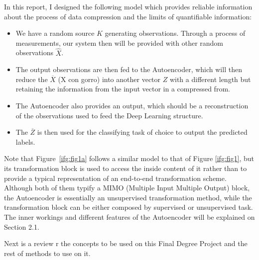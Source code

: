 
In this report, I designed the following model which provides reliable information about the process of data compression and the limits of quantifiable information:

\begin{itemize}
\item  We have a random source $K$ generating observations. Through a process of measurements, our system then will be provided with other random observations $\hat{X}$. 

\item The output observations  are then fed to the Autoencoder, which will then reduce the $\overline X$ (X con gorro) into another vector $Z$ with a different length but retaining the information from the input vector in a compressed from. 

\item The Autoencoder also provides  an output, which should be a reconstruction of the observations used to feed the Deep Learning structure. 

\item The $\overline Z$ is then used for the classifying task of choice to output the predicted labels. 

\end{itemize}

Note that Figure~\ref{ifg:fig1a} follows a similar model to that of Figure \ref{ifg:fig1}, but its transformation block is used to access the inside content of it rather than to provide a typical representation of an end-to-end transformation scheme. Although both of them typify a MIMO (Multiple Input Multiple Output) block, the Autoencoder is essentially an unsupervised transformation method, while the transformation block can be either composed by supervised or unsupervised task. The inner workings and different features of the Autoencoder will be explained on Section 2.1. \par

Next is a review r the concepts to be used on this Final Degree Project and the rest of methods to use on it.
